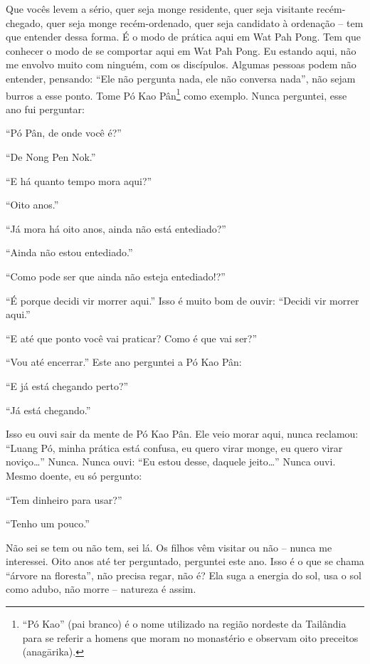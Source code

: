 Que vocês levem a sério, quer seja monge residente, quer seja
visitante recém-chegado, quer seja monge recém-ordenado, quer seja
candidato à ordenação – tem que entender dessa forma. É o modo de
prática aqui em Wat Pah Pong. Tem que conhecer o modo de se comportar
aqui em Wat Pah Pong. Eu estando aqui, não me envolvo muito com
ninguém, com os discípulos. Algumas pessoas podem não entender,
pensando: “Ele não pergunta nada, ele não conversa nada”, não sejam
burros a esse ponto. Tome Pó Kao Pân\footnote{“Pó Kao” (pai branco) é o
nome utilizado na região nordeste da Tailândia para se referir a homens
que moram no monastério e observam oito preceitos (anag\=arika).} como
exemplo. Nunca perguntei, esse ano fui perguntar: 

“Pó Pân, de onde você é?” 

“De Nong Pen Nok.”

“E há quanto tempo mora aqui?”

“Oito anos.” 

“Já mora há oito anos, ainda não está entediado?” 

“Ainda não estou entediado.”

“Como pode ser que ainda não esteja entediado!?”

“É porque decidi vir morrer aqui.” Isso é muito bom de ouvir:
“Decidi vir morrer aqui.” 

“E até que ponto você vai praticar? Como é que vai ser?”

“Vou até encerrar.” Este ano perguntei a Pó Kao Pân:

“E já está chegando perto?”

“Já está chegando.” 

Isso eu ouvi sair da mente de Pó Kao Pân. Ele veio morar aqui, nunca
reclamou: “Luang Pó, minha prática está confusa, eu quero virar monge,
eu quero virar noviço…” Nunca. Nunca ouvi: “Eu estou desse, daquele
jeito…” Nunca ouvi. Mesmo doente, eu só pergunto:

“Tem dinheiro para usar?” 

“Tenho um pouco.” 

Não sei se tem ou não tem, sei lá. Os filhos vêm visitar ou não –
nunca me interessei. Oito anos até ter perguntado, perguntei este ano.
Isso é o que se chama “árvore na floresta”, não precisa regar, não é?
Ela suga a energia do sol, usa o sol como adubo, não morre – natureza é
assim.
